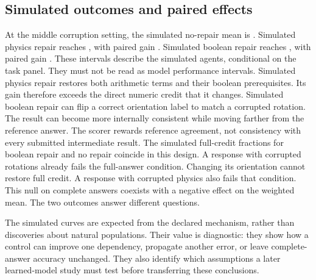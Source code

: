 \documentclass{article}
\begin{document}
\subsection{Simulated outcomes and paired effects}
At the middle corruption setting, the simulated no-repair mean is \Simnone{}. Simulated physics repair reaches \Simphysics{}, with paired gain \Gainphysics{}. Simulated boolean repair reaches \Simboolean{}, with paired gain \Gainboolean{}. These intervals describe the simulated agents, conditional on the task panel. They must not be read as model performance intervals.
Simulated physics repair restores both arithmetic terms and their boolean prerequisites. Its gain therefore exceeds the direct numeric credit that it changes. Simulated boolean repair can flip a correct orientation label to match a corrupted rotation. The result can become more internally consistent while moving farther from the reference answer. The scorer rewards reference agreement, not consistency with every submitted intermediate result.
The simulated full-credit fractions for boolean repair and no repair coincide in this design. A response with corrupted rotations already fails the full-answer condition. Changing its orientation cannot restore full credit. A response with corrupted physics also fails that condition. This null on complete answers coexists with a negative effect on the weighted mean. The two outcomes answer different questions.
\begin{table}[ht]\centering\small\caption{Paired simulated control gains relative to no repair. Intervals resample complete simulated agents and retain condition pairing.}\end{table}
The simulated curves are expected from the declared mechanism, rather than discoveries about natural populations. Their value is diagnostic: they show how a control can improve one dependency, propagate another error, or leave complete-answer accuracy unchanged. They also identify which assumptions a later learned-model study must test before transferring these conclusions.
\end{document}
